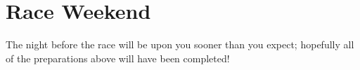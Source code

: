 \documentclass[
  letterpaper, %
  fontsize=10pt, %
  twoside=true,
  chapterentrydots=true, %
  numbers=noenddot,
  fontmethod=tex,
]{kaobook}
\begin{document}










\section{Race Weekend}

The night before the race will be upon you sooner than you expect;
hopefully all of the preparations above will have been completed!
\end{document}
